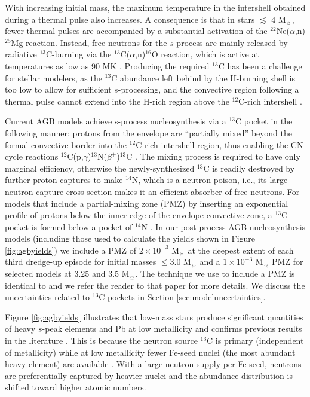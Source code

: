 With increasing initial mass, the maximum temperature in the intershell obtained during a thermal pulse also increases. A consequence is that in stars $\lesssim$ 4 M$_\sun$, fewer thermal pulses are accompanied by a substantial activation of the $^{22}$Ne($\alpha$,n)$^{25}$Mg reaction. Instead, free neutrons for the $s$-process are mainly released by radiative $^{13}$C-burning via the $^{13}$C($\alpha$,n)$^{16}$O reaction, which is active at temperatures as low as 90 MK \citep{Cameron:1955eb,Straniero:1995ed}. Producing the required $^{13}$C has been a challenge for stellar modelers, as the $^{13}$C abundance left behind by the H-burning shell is too low to allow for sufficient $s$-processing, and the convective region following a thermal pulse cannot extend into the H-rich region above the $^{12}$C-rich intershell \citep{Iben:1975js}.

Current AGB models achieve s-process nucleosynthesis via a $^{13}$C pocket in the following manner: protons from the envelope are ``partially mixed'' beyond the formal convective border into the $^{12}$C-rich intershell region, thus enabling the CN cycle reactions $^{12}$C(p,$\gamma$)$^{13}$N($\beta^+$)$^{13}$C \citep{Gallino:1998eg,Arlandini:1999eh}. The mixing process is required to have only marginal efficiency, otherwise the newly-synthesized $^{13}$C is readily destroyed by further proton captures to make $^{14}$N, which is a neutron poison, i.e., its large neutron-capture cross section makes it an efficient absorber of free neutrons. For models that include a partial-mixing zone (PMZ) by inserting an exponential profile of protons below the inner edge of the envelope convective zone, a $^{13}$C pocket is formed below a pocket of $^{14}$N \citep{Cristallo:2009kn,Lugaro:2012ht}. In our post-process AGB nucleosynthesis models (including those used to calculate the yields shown in Figure \ref{fig:agbyields}) we include a PMZ of $2\times 10^{-3}$ M$_\sun$ at the deepest extent of each third dredge-up episode for initial masses $\leq 3.0$ M$_\sun$ and a $1\times 10^{-3}$ M$_\sun$ PMZ for selected models at 3.25 and 3.5 M$_\sun$. The technique we use to include a PMZ is identical to \citet{Lugaro:2012ht} and we refer the reader to that paper for more details. We discuss the uncertainties related to $^{13}$C pockets in Section \ref{sec:modeluncertainties}.

Figure \ref{fig:agbyields} illustrates that low-mass stars produce significant quantities of heavy $s$-peak elements and Pb at low metallicity and confirms previous results in the literature \citep{Travaglio:2001en,VanEck:2001cj,VanEck:2003el,Lugaro:2012ht}. This is because the neutron source $^{13}$C is primary (independent of metallicity) while at low metallicity fewer Fe-seed nuclei (the most abundant heavy element) are available \citep{Clayton:1988tf}. With a large neutron supply per Fe-seed, neutrons are preferentially captured by heavier nuclei and the abundance distribution is shifted toward higher atomic numbers.

